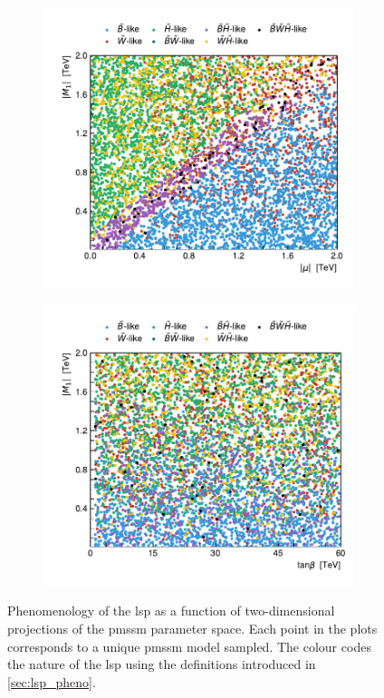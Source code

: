 \begin{figure}[H]
	\vspace{-1.0em}
	\begin{subfigure}[b]{0.47\linewidth}
		\centering\includegraphics[width=\textwidth]{scatter/lsp_types_mu_M1}
	\end{subfigure}\hfill
	\begin{subfigure}[b]{0.47\linewidth}
		\centering\includegraphics[width=\textwidth]{scatter/lsp_types_tanb_M1}
	\end{subfigure}\hfill
	\caption{Phenomenology of the \gls{lsp} as a function of two-dimensional projections of the \gls{pmssm} parameter space. Each point in the plots corresponds to a unique \gls{pmssm} model sampled. The colour codes the nature of the \gls{lsp} using the definitions introduced in \cref{sec:lsp_pheno}.}
	\label{fig:lsp_phenomenology_parameters}
\end{figure}


